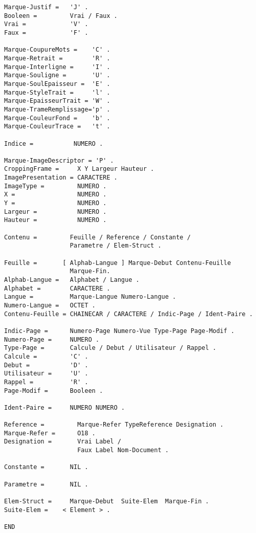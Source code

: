 \begin{verbatim}
Marque-Justif =   'J' .
Booleen =         Vrai / Faux .
Vrai =            'V' .
Faux =            'F' .

Marque-CoupureMots =    'C' .
Marque-Retrait =        'R' .
Marque-Interligne =     'I' .
Marque-Souligne =       'U' .
Marque-SoulEpaisseur =  'E' .
Marque-StyleTrait =     'l' .
Marque-EpaisseurTrait = 'W' .
Marque-TrameRemplissage='p' .
Marque-CouleurFond =    'b' .
Marque-CouleurTrace =   't' .

Indice =           NUMERO .

Marque-ImageDescriptor = 'P' .
CroppingFrame =     X Y Largeur Hauteur .
ImagePresentation = CARACTERE .
ImageType =         NUMERO .
X =                 NUMERO .
Y =                 NUMERO .
Largeur =           NUMERO .
Hauteur =           NUMERO .

Contenu =         Feuille / Reference / Constante /
                  Parametre / Elem-Struct .

Feuille =       [ Alphab-Langue ] Marque-Debut Contenu-Feuille
                  Marque-Fin.
Alphab-Langue =   Alphabet / Langue .
Alphabet =        CARACTERE .
Langue =          Marque-Langue Numero-Langue .
Numero-Langue =   OCTET .
Contenu-Feuille = CHAINECAR / CARACTERE / Indic-Page / Ident-Paire .

Indic-Page =      Numero-Page Numero-Vue Type-Page Page-Modif .
Numero-Page =     NUMERO .
Type-Page =       Calcule / Debut / Utilisateur / Rappel .
Calcule =         'C' .
Debut =           'D' .
Utilisateur =     'U' .
Rappel =          'R' .
Page-Modif =      Booleen .

Ident-Paire =     NUMERO NUMERO .

Reference =         Marque-Refer TypeReference Designation .
Marque-Refer =      O18 .
Designation =       Vrai Label /
                    Faux Label Nom-Document .

Constante =       NIL .

Parametre =       NIL .

Elem-Struct =     Marque-Debut  Suite-Elem  Marque-Fin .
Suite-Elem =    < Element > .

END
\end{verbatim}

\newpage

\tableofcontents


